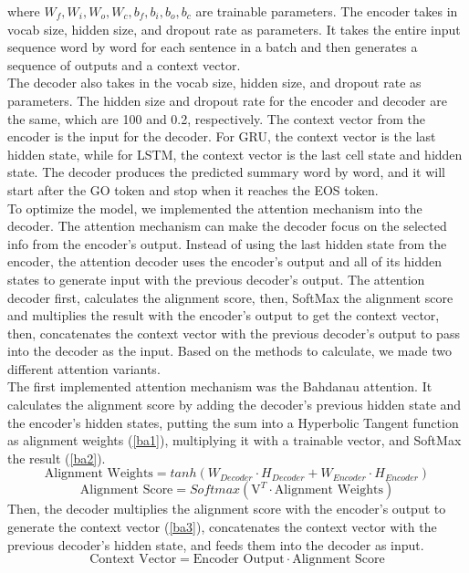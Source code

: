 \documentclass[conference]{IEEEtran}
\begin{document}
where $W_f, W_i, W_o, W_c, b_f, b_i, b_o, b_c$ are trainable parameters.
\indent The encoder takes in vocab size, hidden size, and dropout rate as parameters. It takes the entire input sequence word by word for each sentence in a batch and then generates a sequence of outputs and a context vector. \\
\indent The decoder also takes in the vocab size, hidden size, and dropout rate as parameters. The hidden size and dropout rate for the encoder and decoder are the same, which are 100 and 0.2, respectively. The context vector from the encoder is the input for the decoder. For GRU, the context vector is the last hidden state, while for LSTM, the context vector is the last cell state and hidden state. The decoder produces the predicted summary word by word, and it will start after the GO token and stop when it reaches the EOS token. \\
\indent To optimize the model, we implemented the attention mechanism into the decoder. The attention mechanism can make the decoder focus on the selected info from the encoder’s output. Instead of using the last hidden state from the encoder, the attention decoder uses the encoder’s output and all of its hidden states to generate input with the previous decoder’s output. The attention decoder first, calculates the alignment score, then, SoftMax the alignment score and multiplies the result with the encoder’s output to get the context vector, then, concatenates the context vector with the previous decoder’s output to pass into the decoder as the input. Based on the methods to calculate, we made two different attention variants. \\
\indent The first implemented attention mechanism was the Bahdanau attention. It calculates the alignment score by adding the decoder’s previous hidden state and the encoder’s hidden states, putting the sum into a Hyperbolic Tangent function as alignment weights (\ref{ba1}), multiplying it with a trainable vector, and SoftMax the result (\ref{ba2}).
\begin{dmath}
    \label{ba1}
    \text{Alignment Weights} = tanh(W_{Decoder} \cdot H_{Decoder} + W_{Encoder} \cdot H_{Encoder})
\end{dmath}  
\begin{equation}
    \label{ba2}
\text{Alignment Score} = Softmax(\mathrm{V}_{}^{T} \cdot \text{Alignment Weights})
\end{equation}  
 Then, the decoder multiplies the alignment score with the encoder’s output to generate the context vector (\ref{ba3}), concatenates the context vector with the previous decoder’s hidden state, and feeds them into the decoder as input.
\begin{dmath}
    \label{ba3}
\text{Context Vector} = \text{Encoder Output} \cdot \text{Alignment Score}
\end{dmath}  
\end{document}
